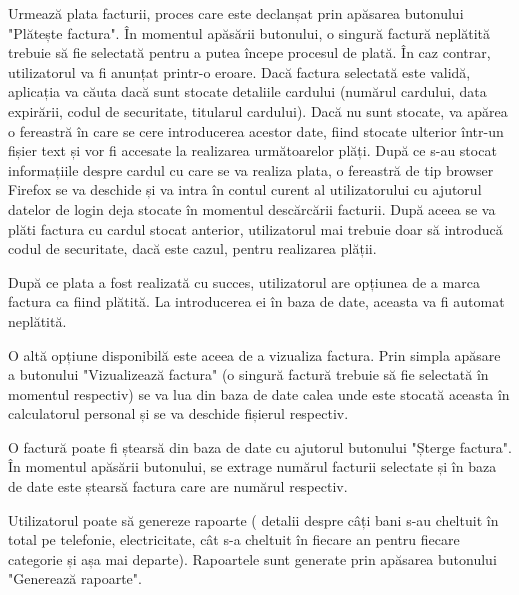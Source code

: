 \documentclass[12pt]{book}
\begin{document}
Urmează plata facturii, proces care este declanșat prin apăsarea butonului "Plătește factura". În momentul apăsării butonului, o singură factură neplătită trebuie să fie selectată pentru a putea începe procesul de plată. În caz contrar, utilizatorul va fi anunțat printr-o eroare. Dacă factura selectată este validă, aplicația va căuta dacă sunt stocate detaliile cardului (numărul cardului, data expirării, codul de securitate, titularul cardului). Dacă nu sunt stocate, va apărea o fereastră în care se cere introducerea acestor date, fiind stocate ulterior într-un fișier text și vor fi accesate la realizarea următoarelor plăți. După ce s-au stocat informațiile despre cardul cu care se va realiza plata, o fereastră de tip browser Firefox se va deschide și va intra în contul curent al utilizatorului cu ajutorul datelor de login deja stocate în momentul descărcării facturii. După aceea se va plăti factura cu cardul stocat anterior, utilizatorul mai trebuie doar să introducă codul de securitate, dacă este cazul, pentru realizarea plății.

După ce plata a fost realizată cu succes, utilizatorul are opțiunea de a marca factura ca fiind plătită. La introducerea ei în baza de date, aceasta va fi automat neplătită. 

O altă opțiune disponibilă este aceea de a vizualiza factura. Prin simpla apăsare a butonului "Vizualizează factura" (o singură factură trebuie să fie selectată în momentul respectiv) se va lua din baza de date calea unde este stocată aceasta în calculatorul personal și se va deschide fișierul respectiv.

O factură poate fi ștearsă din baza de date cu ajutorul butonului "Șterge factura". În momentul apăsării butonului, se extrage numărul facturii selectate și în baza de date este ștearsă factura care are numărul respectiv.

Utilizatorul poate să genereze rapoarte ( detalii despre câți bani s-au cheltuit în total pe telefonie, electricitate, cât s-a cheltuit în fiecare an pentru fiecare categorie și așa mai departe). Rapoartele sunt generate prin apăsarea butonului "Generează rapoarte".
\end{document}
